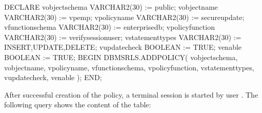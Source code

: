 \documentclass[letterpaper,10pt,english,openany,oneside]{sphinxmanual}
\begin{document}
%
\begin{sphinxVerbatim}[commandchars=\\\{\}]
DECLARE
    v\PYGZus{}object\PYGZus{}schema         VARCHAR2(30) := \PYGZsq{}public\PYGZsq{};
    v\PYGZus{}object\PYGZus{}name           VARCHAR2(30) := \PYGZsq{}vpemp\PYGZsq{};
    v\PYGZus{}policy\PYGZus{}name           VARCHAR2(30) := \PYGZsq{}secure\PYGZus{}update\PYGZsq{};
    v\PYGZus{}function\PYGZus{}schema       VARCHAR2(30) := \PYGZsq{}enterprisedb\PYGZsq{};
    v\PYGZus{}policy\PYGZus{}function       VARCHAR2(30) := \PYGZsq{}verify\PYGZus{}session\PYGZus{}user\PYGZsq{};
    v\PYGZus{}statement\PYGZus{}types       VARCHAR2(30) := \PYGZsq{}INSERT,UPDATE,DELETE\PYGZsq{};
    v\PYGZus{}update\PYGZus{}check          BOOLEAN      := TRUE;
    v\PYGZus{}enable                BOOLEAN      := TRUE;
BEGIN
    DBMS\PYGZus{}RLS.ADD\PYGZus{}POLICY(
        v\PYGZus{}object\PYGZus{}schema,
        v\PYGZus{}object\PYGZus{}name,
        v\PYGZus{}policy\PYGZus{}name,
        v\PYGZus{}function\PYGZus{}schema,
        v\PYGZus{}policy\PYGZus{}function,
        v\PYGZus{}statement\PYGZus{}types,
        v\PYGZus{}update\PYGZus{}check,
        v\PYGZus{}enable
    );
END;
\end{sphinxVerbatim}

After successful creation of the policy, a terminal session is started
by user . The following query shows the content of the 
table:
\end{document}
